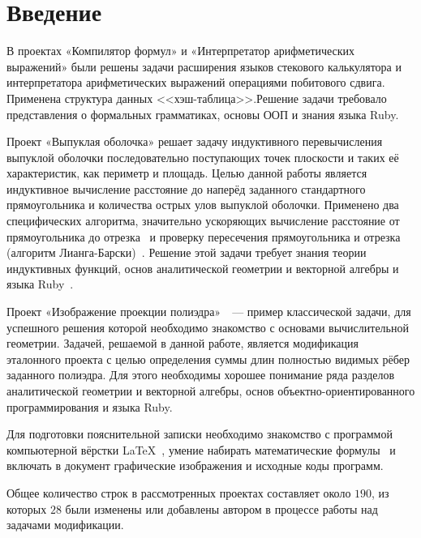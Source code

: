 \section{Введение}

В проектах «Компилятор формул» и «Интерпретатор арифметических
выражений» были решены задачи расширения языков стекового калькулятора
и интерпретатора арифметических выражений операциями побитового сдвига.
Применена структура данных <<хэш-таблица>>.Решение задачи требовало представления
о формальных грамматиках, основы ООП и знания языка Ruby.

Проект «Выпуклая оболочка»\cite{convex} решает задачу индуктивного перевычисления выпуклой оболочки последовательно поступающих точек плоскости и таких её характеристик, как периметр и площадь. Целью данной работы является
индуктивное вычисление расстояние до наперёд заданного стандартного прямоугольника
и количества острых улов выпуклой оболочки. Применено два специфических алгоритма,
значительно ускоряющих вычисление расстояние от прямоугольника до
отрезка~\cite{seginters} и проверку пересечения прямоугольника и
отрезка (алгоритм Лианга-Барски)~\cite{barsky}. Решение этой задачи требует знания
теории индуктивных функций, основ аналитической геометрии и векторной алгебры
и языка Ruby~\cite{ruby}.

Проект «Изображение проекции полиэдра»~\cite{polyedr}~--- пример
классической задачи, для успешного решения которой необходимо знакомство с
основами вычислительной геометрии. Задачей, решаемой в данной работе, является
модификация эталонного проекта с целью определения суммы длин полностью видимых
рёбер заданного полиэдра. Для этого необходимы хорошее понимание ряда разделов
аналитической геометрии и векторной алгебры, основ объектно-ориентированного
программирования и языка Ruby.

Для подготовки пояснительной записки необходимо знакомство с программой компьютерной вёрстки \LaTeX~\cite{rlatex}, умение набирать математические формулы~\cite{texbook} и включать в документ графические изображения и исходные
коды программ.

Общее количество строк в рассмотренных проектах составляет около $190$, из которых $28$ были изменены или добавлены автором в процессе работы над задачами модификации.
